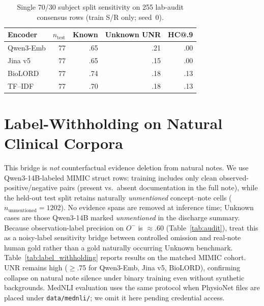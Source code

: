 \documentclass[11pt]{article}
\begin{document}
\begin{table}[!htbp]
  \centering
  \scriptsize
  \renewcommand{\arraystretch}{1.06}
  \caption{Single 70/30 subject split sensitivity on 255 lab-audit consensus
  rows (train S/R only; seed~0).}
  \label{tab:real_sru_split}
  \begin{tabular*}{\columnwidth}{@{\extracolsep{\fill}}lrrrr@{}}
    \toprule
    \textbf{Encoder} & \textbf{$n_{\mathrm{test}}$} &
    \textbf{Known} & \textbf{Unknown UNR} & \textbf{HC@.9} \\
    \midrule
    Qwen3-Emb    & 77 & .65 & .21 & .00 \\
    Jina v5      & 77 & .65 & .15 & .00 \\
    BioLORD      & 77 & .74 & .18 & .13 \\
    TF--IDF      & 77 & .70 & .18 & .13 \\
    \bottomrule
  \end{tabular*}
\end{table}

\section{Label-Withholding on Natural Clinical Corpora}
\label{app:label_withholding}

This bridge is \emph{not} counterfactual evidence deletion from natural notes.
We use Qwen3-14B-labeled MIMIC struct rows: training includes only clean
observed-positive/negative pairs (present vs.\ absent documentation in the
full note), while the held-out test split retains naturally
\emph{unmentioned} concept--note cells ($n_{\mathrm{unmentioned}}=1202$).
No evidence spans are removed at inference time; Unknown cases are those
Qwen3-14B marked \emph{unmentioned} in the discharge summary.
Because observation-label precision on $O^-$ is $\approx$.60
(Table~\ref{tab:audit}), treat this as a noisy-label sensitivity bridge
between controlled omission and real-note human gold rather than a gold
naturally occurring Unknown benchmark. Table~\ref{tab:label_withholding}
reports results on the matched MIMIC cohort. UNR remains high ($\geq$.75 for
Qwen3-Emb, Jina v5, BioLORD), confirming collapse on natural note silence
under binary training even without synthetic backgrounds. MedNLI evaluation
uses the same protocol when PhysioNet files are placed under
\texttt{data/mednli/}; we omit it here pending credential access.
\end{document}
